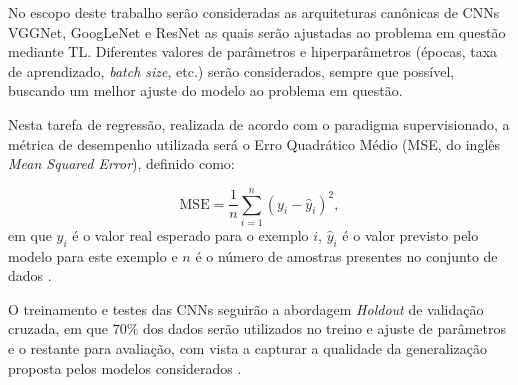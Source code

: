 No escopo deste trabalho serão consideradas as arquiteturas canônicas de CNNs VGGNet, GoogLeNet e ResNet as quais serão ajustadas ao problema em questão mediante TL. Diferentes valores de parâmetros e hiperparâmetros (épocas, taxa de aprendizado, \emph{batch size}, etc.) serão considerados, sempre que possível, buscando um melhor ajuste do modelo ao problema em questão.

Nesta tarefa de regressão, realizada de acordo com o paradigma supervisionado, a métrica de desempenho utilizada será o Erro Quadrático Médio (MSE, do inglês \emph{Mean Squared Error}), definido como:

\begin{equation}
\textrm{MSE} = \frac{1}{n}\sum_{i=1}^n (y_i - \hat{y}_i)^{2}, \label{eq:mse}
\end{equation} em que $y_i$ é o valor real esperado para o exemplo $i$, $\hat{y}_i$ é o valor previsto pelo modelo para este exemplo e $n$ é o número de amostras presentes no conjunto de dados \cite{ref:faceli}.

O treinamento e testes das CNNs seguirão a abordagem \emph{Holdout} de validação cruzada, em que $70\%$ dos dados serão utilizados no treino e ajuste de parâmetros e o restante para avaliação, com vista a capturar a qualidade da generalização proposta pelos modelos considerados \cite{ref:brink}.
